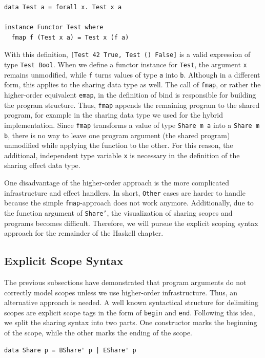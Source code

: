 \documentclass[a4paper, 11pt, fleqn, twoside, abstract=on]{scrreprt}
\newcommand{\hinl}[1]{\texttt{#1}}
\begin{document}
\begin{verbatim}
data Test a = forall x. Test x a

instance Functor Test where
  fmap f (Test x a) = Test x (f a)
\end{verbatim}

With this definition, \hinl{[Test 42 True, Test () False]} is a valid expression of type \hinl{Test Bool}.
When we define a functor instance for \hinl{Test}, the argument \hinl{x} remains unmodified, while \hinl{f} turns values of type \hinl{a} into \hinl{b}.
Although in a different form, this applies to the sharing data type as well.
The call of \hinl{fmap}, or rather the higher-order equivalent \hinl{emap}, in the definition of bind is responsible for building the program structure.
Thus, \hinl{fmap} appends the remaining program to the shared program, for example in the sharing data type we used for the hybrid implementation.
Since \hinl{fmap} transforms a value of type \hinl{Share m a} into a \hinl{Share m b}, there is no way to leave one program argument (the shared program) unmodified while applying the function to the other.
For this reason, the additional, independent type variable \hinl{x} is necessary in the definition of the sharing effect data type.

One disadvantage of the higher-order approach is the more complicated infrastructure and effect handlers.
In short, \hinl{Other} cases are harder to handle because the simple \hinl{fmap}-approach does not work anymore.
Additionally, due to the function argument of \hinl{Share'}, the visualization of sharing scopes and programs becomes difficult.
Therefore, we will pursue the explicit scoping syntax approach for the remainder of the Haskell chapter.

\subsection{Explicit Scope Syntax}
\label{subsec:explicit}
The previous subsections have demonstrated that program arguments do not correctly model scopes unless we use higher-order infrastructure.
Thus, an alternative approach is needed.
A well known syntactical structure for delimiting scopes are explicit scope tags in the form of \hinl{begin} and \hinl{end}.
Following this idea, we split the sharing syntax into two parts.
One constructor marks the beginning of the scope, while the other marks the ending of the scope.

\begin{verbatim}
data Share p = BShare' p | EShare' p
\end{verbatim}
\end{document}
